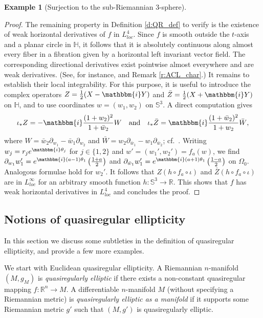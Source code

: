 \documentclass[10pt,letterpaper]{amsart}
\theoremstyle{definition}
\newtheorem{example}[thm]{Example}
\numberwithin{thm}{subsection}
\numberwithin{equation}{section}
\begin{document}
\begin{example}[Surjection to the sub-Riemannian $3$-sphere]
\begin{proof}
The remaining property in Definition \ref{d:QR_def} to verify  is the existence of weak horizontal derivatives of $f$ in
$L^4_{loc}$. Since $f$ is smooth outside  the $t$-axis and a
planar circle in ${\mathbb H}$, it follows that it is absolutely
continuous along almost every fiber in a fibration given by a
horizontal left invariant vector field. The corresponding
directional derivatives exist pointwise almost everywhere and are
weak derivatives. (See, for instance, \cite[Theorem
2.2]{MR1404088} and Remark \ref{r:ACL_char}.) It remains to
establish their local integrability. For this purpose, it is
useful to introduce the complex operators $Z=\frac{1}{2}(X-{\mathbbm{i}} Y)$
and $\bar Z=\frac{1}{2}(X+{\mathbbm{i}} Y)$ on ${\mathbb H}$, and to use
coordinates $w=(w_1,w_2)$ on ${\mathbb S}^3$. A direct computation gives
\begin{equation}\label{eq:pushforward_vfd}
\iota_{\ast} Z = - {\mathbbm{i}} \frac{(1+w_2)^2}{1+\bar w_2} W\quad
\text{and}\quad \iota_{\ast} \bar Z = {\mathbbm{i}} \frac{(1+\bar
w_2)^2}{1+w_2}\bar W,
\end{equation}
where $W= \bar w_2 \partial_{w_1} - \bar w_1 \partial_{w_2}$ and
$\bar W = w_2 \partial_{\bar w_1} - w_1 \partial_{\bar w_2}$; cf.\
\cite[p.\ 320]{KoRe1985}. Writing $w_j = r_j e^{{\mathbbm{i}} \theta_j}$ for
$j \in \{1,2\}$ and $w'=(w_1',w_2') = f_a(w)$, we find
$\partial_{w_1} w_1' = e^{{\mathbbm{i}}
(a-1)\theta_1}\left(\frac{1+a}{2}\right)$ and $\partial_{\bar w_1}
w_1' = e^{{\mathbbm{i}} (a+1)\theta_1}\left(\frac{1-a}{2}\right)$ on
$\Omega_0$. Analogous formulae hold for $w_2'$. It follows that
$Z(h\circ f_a \circ \iota)$ and $\bar Z (h\circ f_a \circ \iota)$
are in $L^{\infty}_{loc}$ for an arbitrary smooth function
$h:{\mathbb S}^3 \to \mathbb{R}$. This shows that $f$ has weak horizontal
derivatives in $L^4_{loc}$ and concludes the proof.
\end{proof}
\end{example}

\subsection{Notions of quasiregular ellipticity}
\label{sec:DefEllipticity}
In this section we discuss some subtleties in the definition of quasiregular ellipticity, and provide a few more examples.

We start with Euclidean quasiregular ellipticity. A Riemannian $n$-manifold $(M, g_M)$ is \emph{quasiregularly elliptic} if there exists a non-constant quasiregular mapping $f: {\mathbb R}^n \rightarrow M$.
A differentiable $n$-manifold $M$ (without specifying a Riemannian metric)  is \emph{quasiregularly elliptic as  a manifold} if it supports some Riemannian metric $g'$  such that $(M, g')$ is quasiregularly elliptic.
\end{document}
